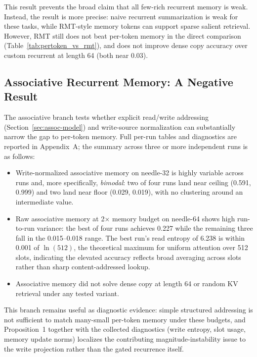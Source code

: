 \documentclass[10pt]{article} %
\begin{document}
This result prevents the broad claim that all few-rich recurrent memory is
weak. Instead, the result is more precise: naive recurrent summarization is
weak for these tasks, while RMT-style memory tokens can support sparse
salient retrieval. However, RMT still does not beat per-token memory in the
direct comparison (Table~\ref{tab:pertoken_vs_rmt}), and does not improve
dense copy accuracy over custom recurrent at length 64 (both near 0.03).

\subsection{Associative Recurrent Memory: A Negative Result}
\label{sec:assoc-negative}

The associative branch tests whether explicit read/write addressing
(Section~\ref{sec:assoc-model}) and write-source normalization can
substantially narrow the gap to per-token memory. Full per-run tables
and diagnostics are reported in Appendix~A; the summary across three or
more independent runs is as follows:
\begin{itemize}[leftmargin=*]
  \item Write-normalized associative memory on needle-32 is highly
  variable across runs and, more specifically, \emph{bimodal}: two of four
  runs land near ceiling (0.591, 0.999) and two land near floor (0.029,
  0.019), with no clustering around an intermediate value.
  \item Raw associative memory at 2$\times$ memory budget on needle-64
  shows high run-to-run variance: the best of four runs achieves 0.227
  while the remaining three fall in the 0.015--0.018 range. The
  best run's read entropy of 6.238 is within 0.001 of $\ln(512)$, the
  theoretical maximum for uniform attention over 512 slots, indicating
  the elevated accuracy reflects broad averaging across slots rather than
  sharp content-addressed lookup.
  \item Associative memory did not solve dense copy at length 64 or random
  KV retrieval under any tested variant.
\end{itemize}
This branch remains useful as diagnostic evidence: simple structured
addressing is not sufficient to match many-small per-token memory under
these budgets, and Proposition~1 together with the collected diagnostics
(write entropy, slot usage, memory update norms) localizes the
contributing magnitude-instability issue to the write projection rather
than the gated recurrence itself.
\end{document}
